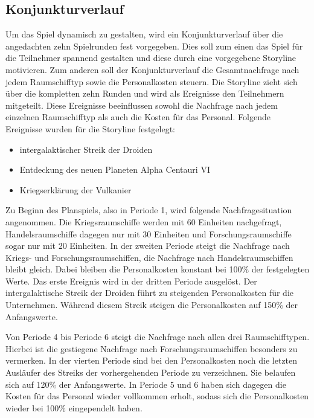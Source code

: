 \subsection{Konjunkturverlauf}
\label{sec:spielwelt-szenario-konjunkturverlauf}


Um das Spiel dynamisch zu gestalten, wird ein Konjunkturverlauf über die angedachten zehn Spielrunden fest vorgegeben. Dies soll zum einen das Spiel für die Teilnehmer spannend gestalten und diese durch eine vorgegebene Storyline motivieren. Zum anderen soll der Konjunkturverlauf die Gesamtnachfrage nach jedem Raumschifftyp sowie die Personalkosten steuern. Die Storyline zieht sich über die kompletten zehn Runden und wird als Ereignisse den Teilnehmern mitgeteilt. Diese Ereignisse beeinflussen sowohl die Nachfrage nach jedem einzelnen Raumschifftyp als auch die Kosten für das Personal. Folgende Ereignisse wurden für die Storyline festgelegt:

\begin{itemize}
\item intergalaktischer Streik der Droiden
\item Entdeckung des neuen Planeten Alpha Centauri VI
\item Kriegserklärung der Vulkanier
\end{itemize}

Zu Beginn des Planspiels, also in Periode 1, wird folgende Nachfragesituation angenommen. Die Kriegsraumschiffe werden mit 60 Einheiten nachgefragt, Handelsraumschiffe dagegen nur mit 30 Einheiten und Forschungsraumschiffe sogar nur mit 20 Einheiten. In der zweiten Periode steigt die Nachfrage nach Kriegs- und Forschungsraumschiffen, die Nachfrage nach Handelsraumschiffen bleibt gleich. Dabei bleiben die Personalkosten konstant bei 100\% der festgelegten Werte. Das erste Ereignis wird in der dritten Periode ausgelöst. Der intergalaktische Streik der Droiden führt zu steigenden Personalkosten für die Unternehmen. Während diesem Streik steigen die Personalkosten auf 150\% der Anfangswerte.
 
Von Periode 4 bis Periode 6 steigt die Nachfrage nach allen drei Raumschifftypen. Hierbei ist die gestiegene Nachfrage nach Forschungsraumschiffen besonders zu vermerken. In der vierten Periode sind bei den Personalkosten noch die letzten Ausläufer des Streiks der vorhergehenden Periode zu verzeichnen. Sie belaufen sich auf 120\% der Anfangswerte. In Periode 5 und 6 haben sich dagegen die Kosten für das Personal wieder vollkommen erholt, sodass sich die Personalkosten wieder bei 100\% eingependelt haben.

